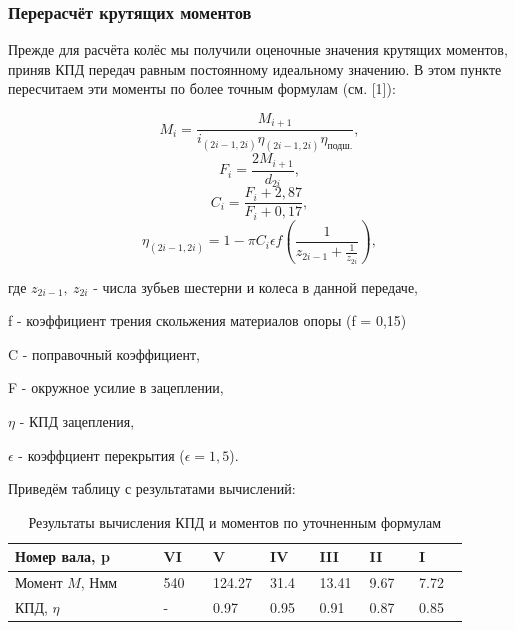 \documentclass[14pt,a4paper,russian]{scrartcl}
\begin{document}
    \subsubsection{Перерасчёт крутящих моментов}
        Прежде для расчёта колёс мы получили оценочные значения крутящих моментов,
        приняв КПД передач равным постоянному идеальному значению. 
        В этом пункте пересчитаем эти моменты по более точным формулам (см. [1]):

        \[ M_i = \frac{M_{i+1}}{i_{(2i-1, 2i)}\eta_{(2i-1, 2i)}\eta_{\text{подш.}}}, \]
        \[ F_i = \frac{2M_{i+1}}{d_{2i}}, \]
        \[ C_i = \frac{F_i+2,87}{F_i+0,17}, \]
        \[ \eta_{(2i-1, 2i)} = 1 - \pi C_i\epsilon f (\frac{1}{z_{2i-1} + \frac{1}{z_{2i}}}), \]

        где\qquad
            \( z_{2i-1},\ z_{2i} \) - числа зубьев шестерни и колеса в данной передаче,\par 
            \qquad f - коэффициент трения скольжения материалов опоры (f = 0,15) \par 
            \qquad C - поправочный коэффициент,\par 
            \qquad F - окружное усилие в зацеплении,\par 
            \qquad \( \eta \) - КПД зацепления,\par 
            \qquad \( \epsilon \) - коэффциент перекрытия (\( \epsilon=1,5 \)).\par
        

        Приведём таблицу с результатами вычислений:
        \begin{table}[h!]
            \begin{center}
                \begin{tabular}{p{0.3\linewidth}p{0.1\linewidth}p{0.1\linewidth}p{0.1\linewidth}p{0.1\linewidth}p{0.1\linewidth}p{0.1\linewidth}}
                    \hline
                    Номер вала, p & VI & V & IV & III & II & I \\
                    \hline
                    Момент \( M \), Нмм & 540 & 124.27 & 31.4 & 13.41 & 9.67 & 7.72  \\
                    \hline
                    КПД, \( \eta \) & - & 0.97 & 0.95 & 0.91 & 0.87 & 0.85 \\
                    \hline
                \end{tabular}
                \caption{Результаты вычисления КПД и моментов по уточненным формулам}\label{tab:gears_kpd}
            \end{center}
        \end{table}
        
\end{document}
